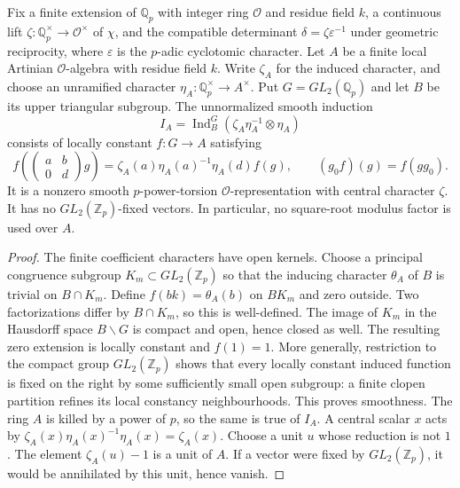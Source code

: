 \begin{proposition}
\label{v4-arith:w5-e:local:ramified-source}
Fix a finite extension of $\mathbb Q_p$ with integer ring $\mathcal O$
and residue field $k$, a continuous lift
$\zeta:\mathbb Q_p^\times\to\mathcal O^\times$ of $\chi$, and the
compatible determinant $\delta=\zeta\varepsilon^{-1}$ under geometric
reciprocity, where $\varepsilon$ is the $p$-adic cyclotomic character. Let $A$ be a finite local Artinian $\mathcal O$-algebra
with residue field $k$. Write $\zeta_A$ for the induced character,
and choose an unramified character $\eta_A:\mathbb Q_p^\times\to A^\times$.
Put $G=GL_2(\mathbb Q_p)$ and let $B$ be its upper triangular subgroup.
The unnormalized smooth induction
\[
 I_A=\operatorname{Ind}_B^G(\zeta_A\eta_A^{-1}\otimes\eta_A)
\]
consists of locally constant $f:G\to A$ satisfying
\[
 f\left(\begin{pmatrix}a&b\\0&d\end{pmatrix}g\right)
 =\zeta_A(a)\eta_A(a)^{-1}\eta_A(d)f(g),
 \qquad (g_0f)(g)=f(gg_0).
\]
It is a nonzero smooth $p$-power-torsion $\mathcal O$-representation
with central character $\zeta$. It has no $GL_2(\mathbb Z_p)$-fixed
vectors. In particular, no square-root modulus factor is used over $A$.
\end{proposition}
\begin{proof}
The finite coefficient characters have open kernels. Choose a principal
congruence subgroup $K_m\subset GL_2(\mathbb Z_p)$ so that the inducing
character $\theta_A$ of $B$ is trivial on $B\cap K_m$.
Define $f(bk)=\theta_A(b)$ on $BK_m$ and zero outside. Two
factorizations differ by $B\cap K_m$, so this is well-defined.
The image of $K_m$ in the Hausdorff space $B\backslash G$ is compact
and open, hence closed as well. The resulting zero extension is
locally constant and $f(1)=1$.
More generally, restriction to the compact group $GL_2(\mathbb Z_p)$
shows that every locally constant induced function is fixed on the
right by some sufficiently small open subgroup: a finite clopen
partition refines its local constancy neighbourhoods. This proves
smoothness. The ring $A$ is killed by a power of $p$, so the same is
true of $I_A$. A central scalar $x$ acts by
$\zeta_A(x)\eta_A(x)^{-1}\eta_A(x)=\zeta_A(x)$.
Choose a unit $u$ whose reduction is not $1$. The element
$\zeta_A(u)-1$ is a unit of $A$. If a vector were fixed by
$GL_2(\mathbb Z_p)$, it would be annihilated by this unit, hence vanish.
\end{proof}

